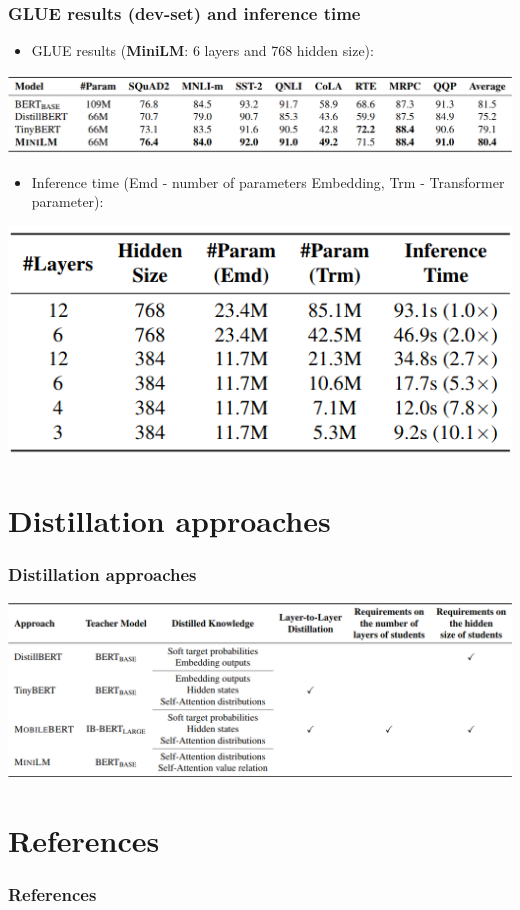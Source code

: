 \documentclass{beamer}
\begin{document}
\begin{frame}
    \frametitle{GLUE results (dev-set) and inference time}
    \begin{itemize}
      \item GLUE results (\textbf{MiniLM}: 6 layers and 768 hidden size):
    \end{itemize}
    \begin{center}
        \includegraphics[scale=0.30]{img/mini_lm_glue.png}
    \end{center}
    \begin{itemize}
      \item Inference time (Emd - number of parameters Embedding, Trm - Transformer parameter):
    \end{itemize}
    \begin{center}
        \includegraphics[scale=0.30]{img/mini_lm_inference_time.png}
    \end{center}
\end{frame}



\section{Distillation approaches}
\begin{frame}
    \frametitle{Distillation approaches}
    \begin{center}
        \includegraphics[scale=0.3]{img/distillation_approaches.png}
    \end{center}
\end{frame}



\section{References}
\begin{frame}[allowframebreaks,t]
    \tiny
    \frametitle{References}
    
    
\end{frame}
\end{document}
